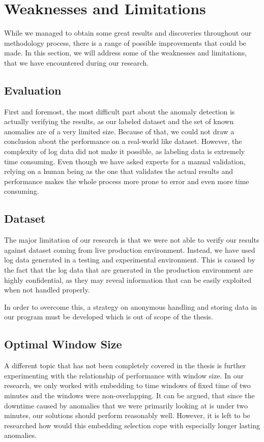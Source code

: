 \section{Weaknesses and Limitations}
While we managed to obtain some great results and discoveries throughout our methodology process, there is a range of possible improvements that could be made.
In this section, we will address some of the weaknesses and limitations, that we have encountered during our research.

\subsection{Evaluation}
First and foremost, the most difficult part about the anomaly detection is actually verifying the results, as our labeled dataset and the set of known anomalies are of a very limited size. Because of that, we could not draw a conclusion about the performance on a real-world like dataset. However, the complexity of log data did not make it possible, as labeling data is extremely time consuming. Even though we have asked experts for a manual validation, relying on a human being as the one that validates the actual results and performance makes the whole process more prone to error and even more time consuming.

\subsection{Dataset}
The major limitation of our research is that we were not able to verify our results against dataset coming from live production environment. Instead, we have used log data generated in a testing and experimental environment.
This is caused by the fact that the log data that are generated in the production environment are highly confidential, as they may reveal information that can be easily exploited when not handled properly. 

In order to overcome this, a strategy on anonymous handling and storing data in our program must be developed which is out of scope of the thesis.

\subsection{Optimal Window Size}
A different topic that has not been completely covered in the thesis is further experimenting with the relationship of performance with window size. 
In our research, we only worked with embedding to time windows of fixed time of two minutes and the windows were non-overlapping.
It can be argued, that since the downtime caused by anomalies that we were primarily looking at is under two minutes, our solutions should perform reasonably well.
However, it is left to be researched how would this embedding selection cope with especially longer lasting anomalies.

